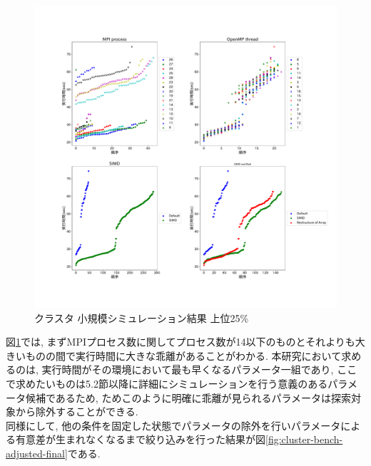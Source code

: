 \begin{figure}[htb]
 \begin{center}
    \includegraphics[width=14cm]{./images/cluster-bench-top25.pdf}
    \caption{クラスタ 小規模シミュレーション結果 上位25\%}
    \label{fig:cluster-bench-top25}
 \end{center}
\end{figure}
図\ref{fig:cluster-bench-top25}では, まずMPIプロセス数に関してプロセス数が14以下のものとそれよりも大きいものの間で実行時間に大きな乖離があることがわかる.
本研究において求めるのは, 実行時間がその環境において最も早くなるパラメータ一組であり,
ここで求めたいものは5.2節以降に詳細にシミュレーションを行う意義のあるパラメータ候補であるため,
ためこのように明確に乖離が見られるパラメータは探索対象から除外することができる.\\
同様にして, 他の条件を固定した状態でパラメータの除外を行いパラメータによる有意差が生まれなくなるまで絞り込みを行った結果が図\ref{fig:cluster-bench-adjusted-final}である.\\

